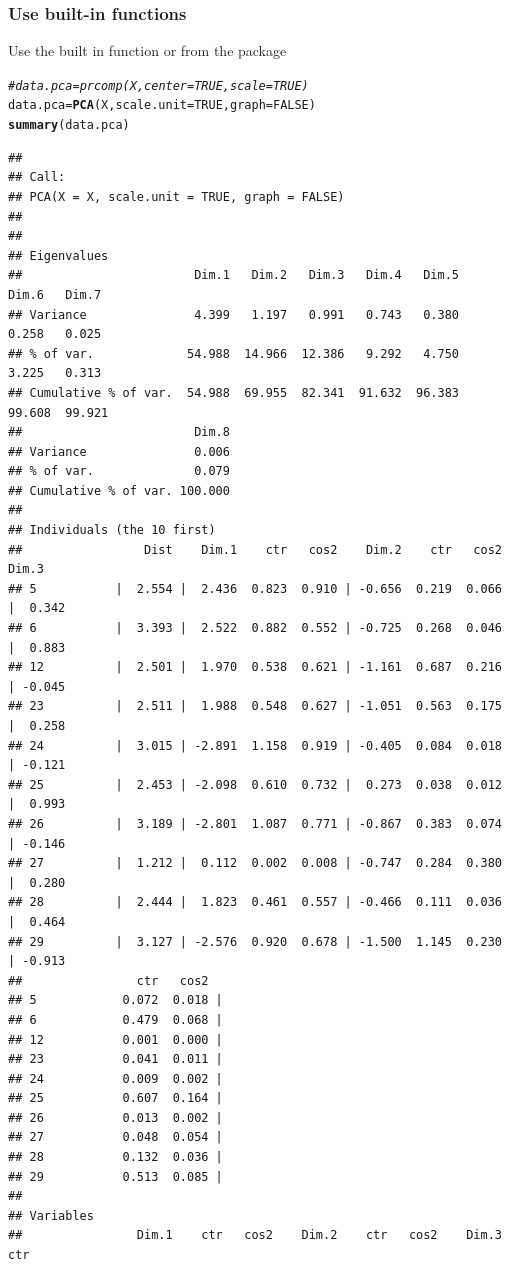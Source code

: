 \documentclass[aspectratio=169]{beamer}\usepackage[]{graphicx}\usepackage[]{xcolor}
\makeatletter
\newcommand{\hlnum}[1]{\textcolor[rgb]{0.686,0.059,0.569}{#1}}%
\newcommand{\hlcom}[1]{\textcolor[rgb]{0.678,0.584,0.686}{\textit{#1}}}%
\newcommand{\hldef}[1]{\textcolor[rgb]{0.345,0.345,0.345}{#1}}%
\newcommand{\hlkwb}[1]{\textcolor[rgb]{0.69,0.353,0.396}{#1}}%
\newcommand{\hlkwc}[1]{\textcolor[rgb]{0.333,0.667,0.333}{#1}}%
\newcommand{\hlkwd}[1]{\textcolor[rgb]{0.737,0.353,0.396}{\textbf{#1}}}%
\newenvironment{kframe}{%
 \def\at@end@of@kframe{}%
 \ifinner\ifhmode%
  \def\at@end@of@kframe{\end{minipage}}%
  \begin{minipage}{\columnwidth}%
 \fi\fi%
 \def\FrameCommand##1{\hskip\@totalleftmargin \hskip-\fboxsep
 \colorbox{shadecolor}{##1}\hskip-\fboxsep
     \hskip-\linewidth \hskip-\@totalleftmargin \hskip\columnwidth}%
 \MakeFramed {\advance\hsize-\width
   \@totalleftmargin\z@ \linewidth\hsize
   \@setminipage}}%
 {\par\unskip\endMakeFramed%
 \at@end@of@kframe}
\newenvironment{knitrout}{}{} %
\makeatother
\begin{document}
\begin{frame}[fragile]\frametitle{Use built-in functions}
Use the built in function  or  from the  package
\vfill
\begin{knitrout}
\color{fgcolor}\begin{kframe}
\begin{alltt}
\hlcom{# data.pca = prcomp(X, center = TRUE, scale = TRUE)}
\hldef{data.pca} \hlkwb{=} \hlkwd{PCA}\hldef{(X,} \hlkwc{scale.unit} \hldef{=} \hlnum{TRUE}\hldef{,} \hlkwc{graph} \hldef{=} \hlnum{FALSE}\hldef{)}
\hlkwd{summary}\hldef{(data.pca)}
\end{alltt}
\begin{verbatim}
## 
## Call:
## PCA(X = X, scale.unit = TRUE, graph = FALSE) 
## 
## 
## Eigenvalues
##                        Dim.1   Dim.2   Dim.3   Dim.4   Dim.5   Dim.6   Dim.7
## Variance               4.399   1.197   0.991   0.743   0.380   0.258   0.025
## % of var.             54.988  14.966  12.386   9.292   4.750   3.225   0.313
## Cumulative % of var.  54.988  69.955  82.341  91.632  96.383  99.608  99.921
##                        Dim.8
## Variance               0.006
## % of var.              0.079
## Cumulative % of var. 100.000
## 
## Individuals (the 10 first)
##                 Dist    Dim.1    ctr   cos2    Dim.2    ctr   cos2    Dim.3
## 5           |  2.554 |  2.436  0.823  0.910 | -0.656  0.219  0.066 |  0.342
## 6           |  3.393 |  2.522  0.882  0.552 | -0.725  0.268  0.046 |  0.883
## 12          |  2.501 |  1.970  0.538  0.621 | -1.161  0.687  0.216 | -0.045
## 23          |  2.511 |  1.988  0.548  0.627 | -1.051  0.563  0.175 |  0.258
## 24          |  3.015 | -2.891  1.158  0.919 | -0.405  0.084  0.018 | -0.121
## 25          |  2.453 | -2.098  0.610  0.732 |  0.273  0.038  0.012 |  0.993
## 26          |  3.189 | -2.801  1.087  0.771 | -0.867  0.383  0.074 | -0.146
## 27          |  1.212 |  0.112  0.002  0.008 | -0.747  0.284  0.380 |  0.280
## 28          |  2.444 |  1.823  0.461  0.557 | -0.466  0.111  0.036 |  0.464
## 29          |  3.127 | -2.576  0.920  0.678 | -1.500  1.145  0.230 | -0.913
##                ctr   cos2  
## 5            0.072  0.018 |
## 6            0.479  0.068 |
## 12           0.001  0.000 |
## 23           0.041  0.011 |
## 24           0.009  0.002 |
## 25           0.607  0.164 |
## 26           0.013  0.002 |
## 27           0.048  0.054 |
## 28           0.132  0.036 |
## 29           0.513  0.085 |
## 
## Variables
##                Dim.1    ctr   cos2    Dim.2    ctr   cos2    Dim.3    ctr

\end{verbatim}
\end{kframe}
\end{knitrout}
\end{frame}
\end{document}
